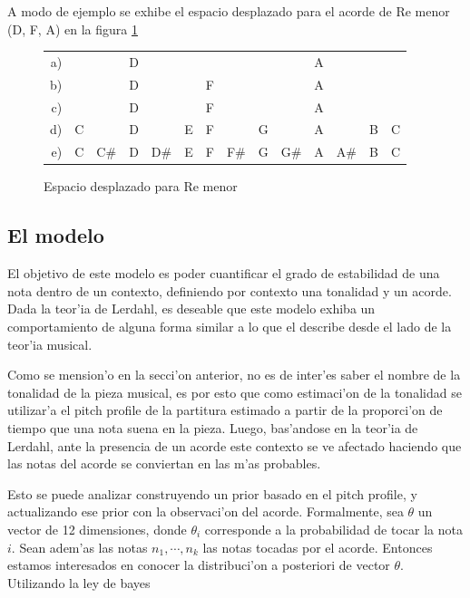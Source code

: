 A modo de ejemplo se exhibe el espacio desplazado para el acorde de Re menor (D, F, A) en la figura \ref{fig:dm_space}

\begin{figure}[!h]
\begin{center}
\begin{tabular}{r c c c c c c c c c c c c c} 
a) &   &     & D &     &   &   &     &   &     & A &     &   &  \\
b) &   &     & D &     &   & F &     &   &     & A &     &   &  \\
c) &   &     & D &     &   & F &     &   &     & A &     &   &  \\
d) & C &     & D &     & E & F &     & G &     & A &     & B & C\\
e) & C & C\# & D & D\# & E & F & F\# & G & G\# & A & A\# & B & C\\
\end{tabular}
\newline
\caption{ Espacio desplazado para Re menor}
\label{fig:dm_space}
\end{center}
\end{figure}

\subsection{El modelo}
\label{sec:harmonic_context_model}
El objetivo de este modelo es poder cuantificar el grado de estabilidad de una nota dentro de un contexto, definiendo por contexto una tonalidad y un acorde. 
Dada la teor'ia de Lerdahl, es deseable que este modelo exhiba un comportamiento de alguna forma similar a lo que el describe desde el lado de la teor'ia musical. 

Como se mension'o en la secci'on anterior, no es de inter'es saber el nombre de la tonalidad de la pieza musical, es por esto que como estimaci'on de la 
tonalidad se utilizar'a el pitch profile de la partitura estimado a partir de la proporci'on de tiempo que una nota suena en la pieza. Luego, bas'andose en 
la teor'ia de Lerdahl, ante la presencia de un acorde este contexto se ve afectado haciendo que las notas del acorde se conviertan en las m'as probables.  

Esto se puede analizar construyendo un prior basado en el pitch profile, y actualizando ese prior con la observaci'on del acorde. 
Formalmente, sea $\theta$ un vector de 12 dimensiones, donde $\theta_i$ corresponde a la probabilidad de tocar la nota $i$. Sean adem'as las notas $n_1, \cdots, n_k$ las notas 
tocadas por el acorde. Entonces estamos interesados en conocer la distribuci'on a posteriori de vector $\theta$. Utilizando la ley de bayes

